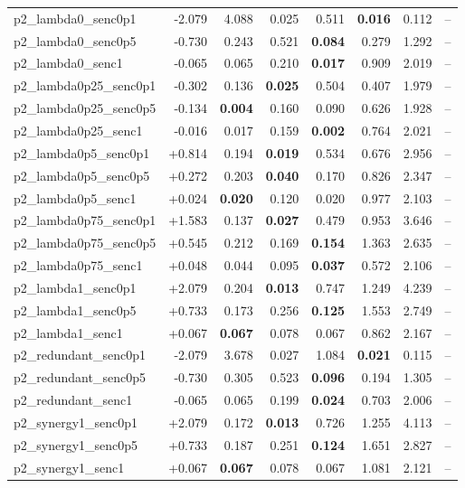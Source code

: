 \documentclass[11pt]{article}
\begin{document}
\begin{longtable}{lrrrrrrr}
p2\_lambda0\_senc0p1 & -2.079 & 4.088 & 0.025 & 0.511 & \textbf{0.016} & 0.112 & --\\
p2\_lambda0\_senc0p5 & -0.730 & 0.243 & 0.521 & \textbf{0.084} & 0.279 & 1.292 & --\\
p2\_lambda0\_senc1 & -0.065 & 0.065 & 0.210 & \textbf{0.017} & 0.909 & 2.019 & --\\
p2\_lambda0p25\_senc0p1 & -0.302 & 0.136 & \textbf{0.025} & 0.504 & 0.407 & 1.979 & --\\
p2\_lambda0p25\_senc0p5 & -0.134 & \textbf{0.004} & 0.160 & 0.090 & 0.626 & 1.928 & --\\
p2\_lambda0p25\_senc1 & -0.016 & 0.017 & 0.159 & \textbf{0.002} & 0.764 & 2.021 & --\\
p2\_lambda0p5\_senc0p1 & +0.814 & 0.194 & \textbf{0.019} & 0.534 & 0.676 & 2.956 & --\\
p2\_lambda0p5\_senc0p5 & +0.272 & 0.203 & \textbf{0.040} & 0.170 & 0.826 & 2.347 & --\\
p2\_lambda0p5\_senc1 & +0.024 & \textbf{0.020} & 0.120 & 0.020 & 0.977 & 2.103 & --\\
p2\_lambda0p75\_senc0p1 & +1.583 & 0.137 & \textbf{0.027} & 0.479 & 0.953 & 3.646 & --\\
p2\_lambda0p75\_senc0p5 & +0.545 & 0.212 & 0.169 & \textbf{0.154} & 1.363 & 2.635 & --\\
p2\_lambda0p75\_senc1 & +0.048 & 0.044 & 0.095 & \textbf{0.037} & 0.572 & 2.106 & --\\
p2\_lambda1\_senc0p1 & +2.079 & 0.204 & \textbf{0.013} & 0.747 & 1.249 & 4.239 & --\\
p2\_lambda1\_senc0p5 & +0.733 & 0.173 & 0.256 & \textbf{0.125} & 1.553 & 2.749 & --\\
p2\_lambda1\_senc1 & +0.067 & \textbf{0.067} & 0.078 & 0.067 & 0.862 & 2.167 & --\\
p2\_redundant\_senc0p1 & -2.079 & 3.678 & 0.027 & 1.084 & \textbf{0.021} & 0.115 & --\\
p2\_redundant\_senc0p5 & -0.730 & 0.305 & 0.523 & \textbf{0.096} & 0.194 & 1.305 & --\\
p2\_redundant\_senc1 & -0.065 & 0.065 & 0.199 & \textbf{0.024} & 0.703 & 2.006 & --\\
p2\_synergy1\_senc0p1 & +2.079 & 0.172 & \textbf{0.013} & 0.726 & 1.255 & 4.113 & --\\
p2\_synergy1\_senc0p5 & +0.733 & 0.187 & 0.251 & \textbf{0.124} & 1.651 & 2.827 & --\\
p2\_synergy1\_senc1 & +0.067 & \textbf{0.067} & 0.078 & 0.067 & 1.081 & 2.121 & --\\

\end{longtable}
\end{document}
